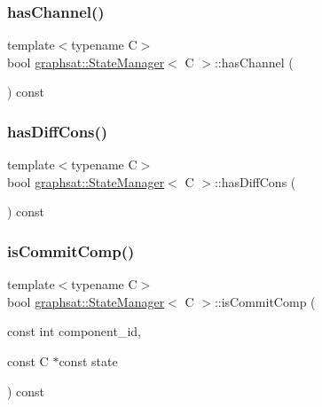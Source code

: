\mbox{\label{classgraphsat_1_1_state_manager_ab6d437e68650d61046eca910844afc59}} 
\subsubsection{\texorpdfstring{hasChannel()}{hasChannel()}}
{\footnotesize\ttfamily template$<$typename C$>$ \\
bool \mbox{\hyperlink{classgraphsat_1_1_state_manager}{graphsat\+::\+State\+Manager}}$<$ C $>$\+::has\+Channel (\begin{DoxyParamCaption}{ }\end{DoxyParamCaption}) const\hspace{0.3cm}{\ttfamily [inline]}}

\mbox{\label{classgraphsat_1_1_state_manager_ad4d691f28f80f4c012fe2669951e3a68}} 
\subsubsection{\texorpdfstring{hasDiffCons()}{hasDiffCons()}}
{\footnotesize\ttfamily template$<$typename C$>$ \\
bool \mbox{\hyperlink{classgraphsat_1_1_state_manager}{graphsat\+::\+State\+Manager}}$<$ C $>$\+::has\+Diff\+Cons (\begin{DoxyParamCaption}{ }\end{DoxyParamCaption}) const\hspace{0.3cm}{\ttfamily [inline]}}

\mbox{\label{classgraphsat_1_1_state_manager_adcdc20f4752f6f18c561937b2e0e5267}} 
\subsubsection{\texorpdfstring{isCommitComp()}{isCommitComp()}}
{\footnotesize\ttfamily template$<$typename C$>$ \\
bool \mbox{\hyperlink{classgraphsat_1_1_state_manager}{graphsat\+::\+State\+Manager}}$<$ C $>$\+::is\+Commit\+Comp (\begin{DoxyParamCaption}\item[{const int}]{component\+\_\+id,  }\item[{const C $\ast$const}]{state }\end{DoxyParamCaption}) const\hspace{0.3cm}{\ttfamily [inline]}}

